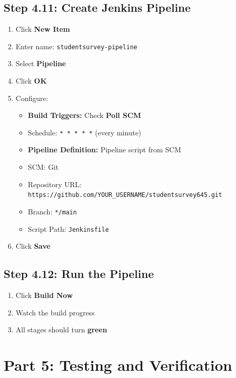 \documentclass[12pt,a4paper]{article}
\begin{document}
\subsection{Step 4.11: Create Jenkins Pipeline}

\begin{enumerate}
    \item Click \textbf{New Item}
    \item Enter name: \texttt{studentsurvey-pipeline}
    \item Select \textbf{Pipeline}
    \item Click \textbf{OK}
    \item Configure:
    \begin{itemize}
        \item \textbf{Build Triggers:} Check \textbf{Poll SCM}
        \item Schedule: \texttt{* * * * *} (every minute)
        \item \textbf{Pipeline Definition:} Pipeline script from SCM
        \item SCM: Git
        \item Repository URL: \texttt{https://github.com/YOUR\_USERNAME/studentsurvey645.git}
        \item Branch: \texttt{*/main}
        \item Script Path: \texttt{Jenkinsfile}
    \end{itemize}
    \item Click \textbf{Save}
\end{enumerate}

\subsection{Step 4.12: Run the Pipeline}

\begin{enumerate}
    \item Click \textbf{Build Now}
    \item Watch the build progress
    \item All stages should turn \textbf{green}
\end{enumerate}

\newpage

\section{Part 5: Testing and Verification}
\end{document}
